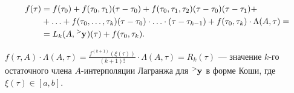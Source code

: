 
\begin{theorem}
	\begin{align*}
		f(\tau) &= f(\tau_0) + f(\tau_0, \tau_1) (\tau - \tau_0) + f(\tau_0, \tau_1, \tau_2) (\tau - \tau_0) (\tau - \tau_1) + \\ &+ \dotsc + f(\tau_0, \dotsc, \tau_k) (\tau - \tau_0) \cdot \dotsc \cdot (\tau - \tau_{k - 1}) + f(\tau_0, \tau_k) \cdot \Lambda(A, \tau) = \\ &= L_k(A, \tensor[^{>}]{\mathbf{y}}{})(\tau) + f(\tau_0, \tau_k).
	\end{align*}
	
	$f(\tau, A) \cdot \Lambda(A, \tau) = \frac{f^{(k + 1)} (\xi(\tau))}{(k + 1)!} \cdot \Lambda(A, \tau) = R_k(\tau)$ --- значение $k$-го остаточного члена $A$-интерполяции Лагранжа для $\tensor[^{>}]{\mathbf{y}}{}$ в форме Коши, где $\xi(\tau) \in [a, b]$.
\end{theorem}

